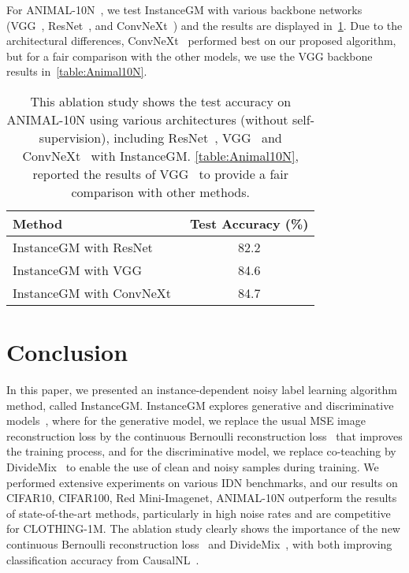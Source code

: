 \documentclass[10pt,twocolumn,letterpaper]{article}
\begin{document}
    For ANIMAL-10N~\cite{song2019selfie}, we test InstanceGM with various backbone networks (VGG~\cite{simonyan2014very}, ResNet~\cite{he2016deep}, and ConvNeXt~\cite{liu2022convnet}) and the results are displayed in~\cref{tab:ablation_animal}. 
Due to the architectural differences, ConvNeXt~\cite{liu2022convnet} performed best on our proposed algorithm, but for a fair comparison with the other models, we use the VGG backbone~\cite{simonyan2014very} results in~\cref{table:Animal10N}.
    
    
    
    
    \begin{table}[t]
        \centering
        \caption{This ablation study shows the test accuracy  on ANIMAL-10N using various architectures (without self-supervision), including ResNet~\cite{he2016deep}, VGG~\cite{simonyan2014very} and ConvNeXt~\cite{liu2022convnet} with InstanceGM. \cref{table:Animal10N}, reported the results of VGG~\cite{simonyan2014very} to provide a fair comparison with other methods.}
        \label{tab:ablation_animal}
        \begin{tabular}{l  c}
            \toprule
            \bfseries Method & \bfseries Test Accuracy (\%) \\
            \midrule
            InstanceGM with ResNet~\cite{he2016deep} & 82.2 \\
            InstanceGM with VGG~\cite{simonyan2014very} & 84.6\\
            InstanceGM with ConvNeXt~\cite{liu2022convnet} & 84.7\\
            \bottomrule
        \end{tabular}
\end{table}
     \section{Conclusion}
\label{sec:conclusion}



In this paper, we presented an instance-dependent noisy label learning algorithm method, called InstanceGM. 
InstanceGM explores generative and discriminative models~\cite{yao2021instance}, where for the generative model, we replace the usual MSE image reconstruction loss by the continuous Bernoulli reconstruction loss~\cite{loaiza2019continuous} that improves the training process, and for the discriminative model, we replace co-teaching by DivideMix~\cite{li2020dividemix} to enable the use of clean and noisy samples during training.
We performed extensive experiments on various IDN benchmarks, and our results on CIFAR10, CIFAR100, Red Mini-Imagenet, ANIMAL-10N outperform the results of state-of-the-art methods, particularly in high noise rates and are competitive for CLOTHING-1M. 
The ablation study clearly shows the importance of the new continuous Bernoulli reconstruction loss~\cite{loaiza2019continuous} and DivideMix~\cite{li2020dividemix}, with both improving classification accuracy from CausalNL~\cite{yao2021instance}.
%
     
\end{document}
